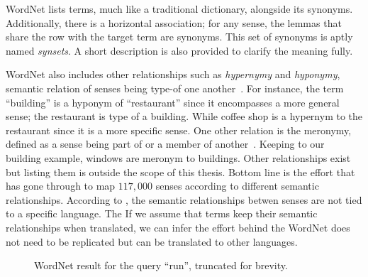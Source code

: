 WordNet lists terms, much like a traditional dictionary, alongside its synonyms.
Additionally, there is a horizontal association; for any sense, the lemmas that share the row with the target term are synonyms.
This set of synonyms is aptly named \emph{synsets}.
A short description is also provided to clarify the meaning fully.

WordNet also includes other relationships such as \emph{hypernymy} and \emph{hyponymy}, semantic relation of senses being type-of one another~\cite{miller_nouns_1990}.
For instance, the term \enquote{building} is a hyponym of \enquote{restaurant} since it encompasses a more general sense; the restaurant is type of a building.
While coffee shop is a hypernym to the restaurant since it is a more specific sense.
One other relation is the meronymy, defined as a sense being part of or a member of another~\cite{winston_taxonomy_1987}.
Keeping to our building example, windows are meronym to buildings.
Other relationships exist but listing them is outside the scope of this thesis.
Bottom line is the effort that has gone through to map $117,000$ senses according to different semantic relationships. %
According to \textcite{sagot_building_2008}, the semantic relationships betwen senses are not tied to a specific language.
The
If we assume that terms keep their semantic relationships when translated, we can infer the effort behind the WordNet does not need to be replicated but can be translated to other languages.

\begin{figure}[!hbp]
    \begin{center}
        {%
            \setlength{\fboxsep}{1pt}%
            \setlength{\fboxrule}{1pt}%
        }%
        \caption{WordNet result for the query \enquote{run}, truncated for brevity.}\label{fig:example_run}
    \end{center}
\end{figure}

